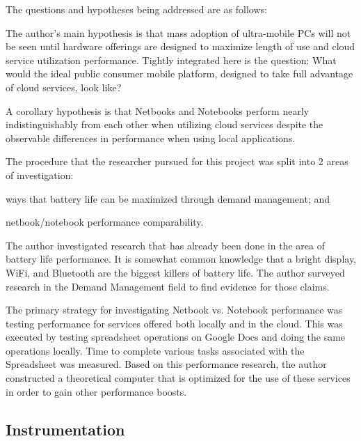 The questions and hypotheses being addressed are as follows:
\begin{inparaenum}[(1)]
  \item The author's main hypothesis is that mass adoption of ultra-mobile PCs
    will not be seen until hardware offerings are designed to maximize length of
    use and cloud service utilization performance.  Tightly integrated here is
    the question: What would the ideal public consumer mobile platform, designed
    to take full advantage of cloud services, look like?
  \item A corollary hypothesis is that Netbooks and Notebooks perform nearly
    indistinguishably from each other when utilizing cloud services despite the
    observable differences in performance when using local applications.
\end{inparaenum}

The procedure that the researcher pursued for this project was split into 2 areas
of investigation:
\begin{inparaenum}[(1)]
\item ways that battery life can be maximized through demand management; and
\item netbook/notebook performance comparability.
\end{inparaenum}

The author investigated research that has already been done in the area of
battery life performance.  It is somewhat common knowledge that a bright
display, WiFi, and Bluetooth are the biggest killers of battery life.  The
author surveyed research in the Demand Management field to find evidence for
those claims.

The primary strategy for investigating Netbook vs. Notebook performance was
testing performance for services offered both locally and in the cloud.  This
was executed by testing spreadsheet operations on Google Docs and doing the same
operations locally.  Time to complete various tasks associated with the
Spreadsheet was measured.  Based on this performance research, the author
constructed a theoretical computer that is optimized for the use of these
services in order to gain other performance boosts.

\subsection{Instrumentation}


